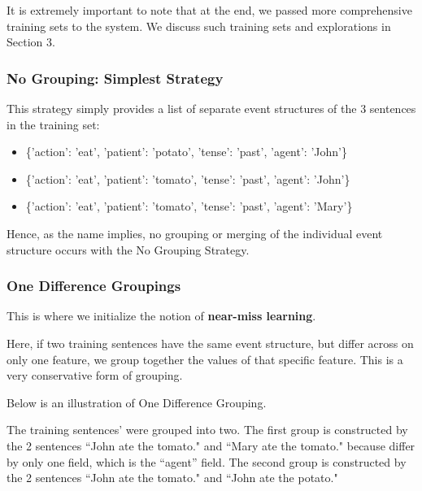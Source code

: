 \documentclass{article}[12pt]
\theoremstyle{definition}
\begin{document}
It is extremely important to note that at the end, we passed more comprehensive training sets to the system. We discuss such training sets and explorations in Section 3. 

\subsubsection{No Grouping: Simplest Strategy}

This strategy simply provides a list of separate event structures of the 3 sentences in the training set: 

\begin{itemize}
\item\{{'action': 'eat', 'patient': 'potato', 'tense': 'past', 'agent': 'John'}\}
\item\{{'action': 'eat', 'patient': 'tomato', 'tense': 'past', 'agent': 'John'}\}
\item\{{'action': 'eat', 'patient': 'tomato', 'tense': 'past', 'agent': 'Mary'}\}
\end{itemize}

Hence, as the name implies, no grouping or merging of the individual event structure occurs with the No Grouping Strategy.

\subsubsection{One Difference Groupings}

This is where we initialize the notion of \textbf{near-miss learning}. 

Here, if two training sentences have the same event structure, but differ across on only one feature, we group together the values of that specific feature. This is a very conservative form of grouping. 

Below is an illustration of One Difference Grouping. 

\begin{spverbatim}
\end{spverbatim}

The training sentences' were grouped into two. The first group is constructed by the 2 sentences ``John ate the tomato." and ``Mary ate the tomato." because differ by only one field, which is the ``agent'' field. The second group is constructed by the 2 sentences ``John ate the tomato." and ``John ate the potato."
\end{document}

